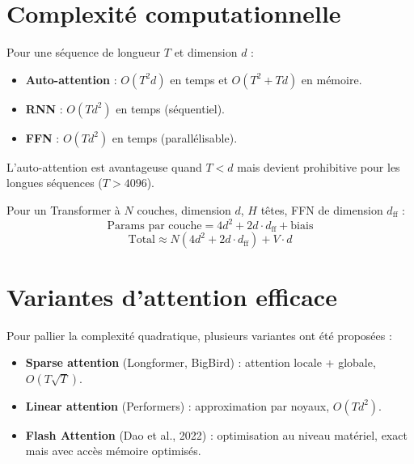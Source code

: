 \section{Complexit\'e computationnelle}
\label{sec:att:complexite}

\begin{proposition}
Pour une s\'equence de longueur $T$ et dimension $d$ :
\begin{itemize}
    \item \textbf{Auto-attention} : $O(T^2 d)$ en temps et $O(T^2 + Td)$ en m\'emoire.
    \item \textbf{RNN} : $O(T d^2)$ en temps (s\'equentiel).
    \item \textbf{FFN} : $O(T d^2)$ en temps (parall\'elisable).
\end{itemize}
L'auto-attention est avantageuse quand $T < d$ mais devient prohibitive pour
les longues s\'equences ($T > 4096$).
\end{proposition}

\begin{formules}[title=\textbf{Nombre de param\`etres d'un Transformer}]
Pour un Transformer \`a $N$ couches, dimension $d$, $H$ t\^etes, FFN de
dimension $d_{\text{ff}}$ :
\[
\text{Params par couche} = 4d^2 + 2d \cdot d_{\text{ff}} + \text{biais}
\]
\[
\text{Total} \approx N(4d^2 + 2d \cdot d_{\text{ff}}) + V \cdot d
\]
\end{formules}

\section{Variantes d'attention efficace}
\label{sec:att:efficace}

Pour pallier la complexit\'e quadratique, plusieurs variantes ont \'et\'e
propos\'ees :

\begin{itemize}
    \item \textbf{Sparse attention} (Longformer, BigBird) : attention locale
          + globale, $O(T \sqrt{T})$.
    \item \textbf{Linear attention} (Performers) : approximation par noyaux,
          $O(Td^2)$.
    \item \textbf{Flash Attention} (Dao et al., 2022) : optimisation au niveau
          mat\'eriel, exact mais avec acc\`es m\'emoire optimis\'es.
\end{itemize}


